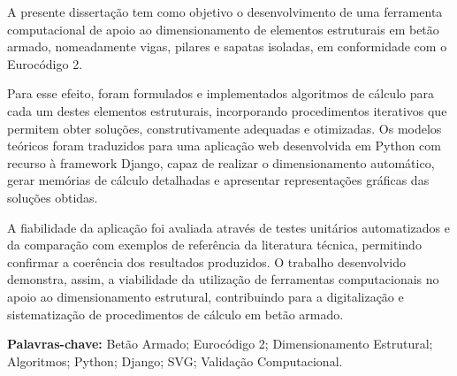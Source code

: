 A presente dissertação tem como objetivo o desenvolvimento de uma ferramenta computacional de apoio ao dimensionamento de elementos estruturais em betão armado, nomeadamente vigas, pilares e sapatas isoladas, em conformidade com o Eurocódigo 2.

Para esse efeito, foram formulados e implementados algoritmos de cálculo para cada um destes elementos estruturais, incorporando procedimentos iterativos que permitem obter soluções, construtivamente adequadas e otimizadas. Os modelos teóricos foram traduzidos para uma aplicação web desenvolvida em Python com recurso à framework Django, capaz de realizar o dimensionamento automático, gerar memórias de cálculo detalhadas e apresentar representações gráficas das soluções obtidas.

A fiabilidade da aplicação foi avaliada através de testes unitários automatizados e da comparação com exemplos de referência da literatura técnica, permitindo confirmar a coerência dos resultados produzidos. O trabalho desenvolvido demonstra, assim, a viabilidade da utilização de ferramentas computacionais no apoio ao dimensionamento estrutural, contribuindo para a digitalização e sistematização de procedimentos de cálculo em betão armado.

\vfill
\textbf{Palavras-chave:} Betão Armado; Eurocódigo 2; Dimensionamento Estrutural; Algoritmos; Python; Django; SVG; Validação Computacional.